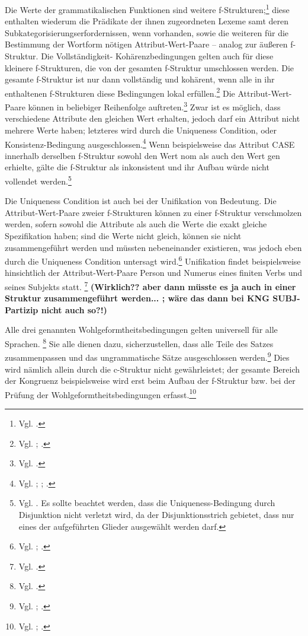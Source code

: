 \documentclass[12pt,a4paper]{article}
\begin{document}
Die Werte der grammatikalischen Funktionen sind weitere f-Strukturen;\footnote{Vgl. \cite[35]{Rohrer}.} diese enthalten wiederum die Prädikate der ihnen zugeordneten Lexeme samt deren Subkategorisierungserfordernissen, wenn vorhanden, sowie die weiteren für die Bestimmung der Wortform nötigen Attribut-Wert-Paare -- analog zur äußeren f-Struktur. Die Vollständigkeit- Kohärenzbedingungen gelten auch für diese kleinere f-Strukturen, die von der gesamten f-Struktur umschlossen werden. Die gesamte f-Struktur ist nur dann vollständig und kohärent, wenn alle in ihr enthaltenen f-Strukturen diese Bedingungen lokal erfüllen.\footnote{Vgl. \cite[60]{Falk}; \cite[19-21]{Skript}.}
Die Attribut-Wert-Paare können in beliebiger Reihenfolge auftreten.\footnote{Vgl. \cite[35]{Rohrer}.} Zwar ist es möglich, dass verschiedene Attribute den gleichen Wert erhalten, jedoch darf ein Attribut nicht mehrere Werte haben; letzteres wird durch die Uniqueness Condition, oder Konsistenz-Bedingung ausgeschlossen.\footnote{Vgl. \cite[62]{Falk}; \cite[29]{Rohrer}; \cite[18-9]{Skript}.} Wenn beispielsweise das Attribut CASE innerhalb derselben f-Struktur sowohl den Wert nom als auch den Wert gen erhielte, gälte die f-Struktur als inkonsistent und ihr Aufbau würde nicht vollendet werden.\footnote{Vgl. \cite[29; 35]{Rohrer}. Es sollte beachtet werden, dass die Uniqueness-Bedingung durch Disjunktion nicht verletzt wird, da der Disjunktionsstrich gebietet, dass nur eines der aufgeführten Glieder ausgewählt werden darf.} 

Die Uniqueness Condition ist auch bei der Unifikation von Bedeutung. Die Attribut-Wert-Paare zweier f-Strukturen können zu einer f-Struktur verschmolzen werden, sofern sowohl die Attribute als auch die Werte die exakt gleiche Spezifikation haben; sind die Werte nicht gleich, können sie nicht zusammengeführt werden und müssten nebeneinander existieren, was jedoch eben durch die Uniqueness Condition untersagt wird.\footnote{Vgl. \cite[37]{Rohrer}; \cite[18-9]{Skript}.} Unifikation findet beispielsweise hinsichtlich der Attribut-Wert-Paare Person und Numerus eines finiten Verbs und seines Subjekts statt. \footnote{Vgl. \cite[38]{Rohrer}.} \textbf{(Wirklich?? aber dann müsste es ja auch in einer Struktur zusammengeführt werden... ; wäre das dann bei KNG SUBJ-Partizip nicht auch so?!)}

Alle drei genannten Wohlgeformtheitsbedingungen gelten universell für alle Sprachen. \footnote{Vgl. \cite[21]{Skript}.} Sie alle dienen dazu, sicherzustellen, dass alle Teile des Satzes zusammenpassen und das ungrammatische Sätze ausgeschlossen werden.\footnote{Vgl. \cite[58; 62]{Falk}; \cite[29]{Rohrer}.} Dies wird nämlich allein durch die c-Struktur nicht gewährleistet; der gesamte Bereich der Kongruenz beispielsweise wird erst beim Aufbau der f-Struktur bzw. bei der Prüfung der Wohlgeformtheitsbedingungen erfasst.\footnote{Vgl. \cite[24]{Rohrer}; \cite[18]{Skript}.}
\end{document}
